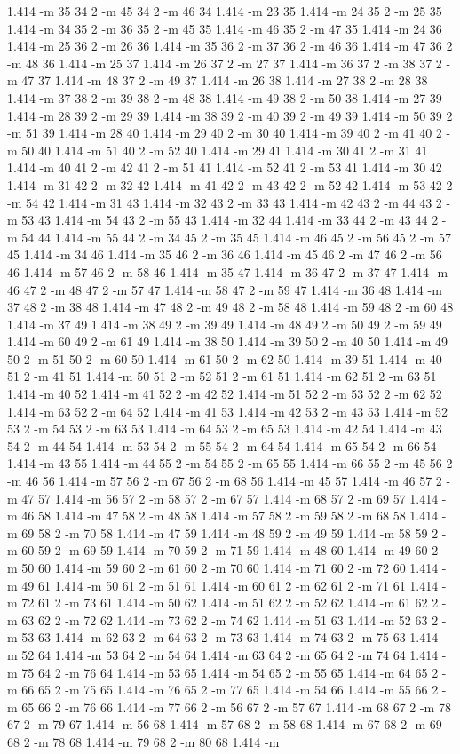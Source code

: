 \documentclass[12pt]{article}
\begin{document}
1.414 -m 35 34 2 -m 45 34 2 -m 46 34 1.414 -m 23 35 1.414 -m 24 35 2 -m 25 35 1.414 -m 34 35 2 -m 36 35 2 -m 45 35 1.414 -m 46 35 2 -m 47 35 1.414 -m 24 36 1.414 -m 25 36 2 -m 26 36 1.414 -m 35 36 2 -m 37 36 2 -m 46 36 1.414 -m 47 36 2 -m 48 36 1.414 -m 25 37 1.414 -m 26 37 2 -m 27 37 1.414 -m 36 37 2 -m 38 37 2 -m 47 37 1.414 -m 48 37 2 -m 49 37 1.414 -m 26 38 1.414 -m 27 38 2 -m 28 38 1.414 -m 37 38 2 -m 39 38 2 -m 48 38 1.414 -m 49 38 2 -m 50 38 1.414 -m 27 39 1.414 -m 28 39 2 -m 29 39 1.414 -m 38 39 2 -m 40 39 2 -m 49 39 1.414 -m 50 39 2 -m 51 39 1.414 -m 28 40 1.414 -m 29 40 2 -m 30 40 1.414 -m 39 40 2 -m 41 40 2 -m 50 40 1.414 -m 51 40 2 -m 52 40 1.414 -m 29 41 1.414 -m 30 41 2 -m 31 41 1.414 -m 40 41 2 -m 42 41 2 -m 51 41 1.414 -m 52 41 2 -m 53 41 1.414 -m 30 42 1.414 -m 31 42 2 -m 32 42 1.414 -m 41 42 2 -m 43 42 2 -m 52 42 1.414 -m 53 42 2 -m 54 42 1.414 -m 31 43 1.414 -m 32 43 2 -m 33 43 1.414 -m 42 43 2 -m 44 43 2 -m 53 43 1.414 -m 54 43 2 -m 55 43 1.414 -m 32 44 1.414 -m 33 44 2 -m 43 44 2 -m 54 44 1.414 -m 55 44 2 -m 34 45 2 -m 35 45 1.414 -m 46 45 2 -m 56 45 2 -m 57 45 1.414 -m 34 46 1.414 -m 35 46 2 -m 36 46 1.414 -m 45 46 2 -m 47 46 2 -m 56 46 1.414 -m 57 46 2 -m 58 46 1.414 -m 35 47 1.414 -m 36 47 2 -m 37 47 1.414 -m 46 47 2 -m 48 47 2 -m 57 47 1.414 -m 58 47 2 -m 59 47 1.414 -m 36 48 1.414 -m 37 48 2 -m 38 48 1.414 -m 47 48 2 -m 49 48 2 -m 58 48 1.414 -m 59 48 2 -m 60 48 1.414 -m 37 49 1.414 -m 38 49 2 -m 39 49 1.414 -m 48 49 2 -m 50 49 2 -m 59 49 1.414 -m 60 49 2 -m 61 49 1.414 -m 38 50 1.414 -m 39 50 2 -m 40 50 1.414 -m 49 50 2 -m 51 50 2 -m 60 50 1.414 -m 61 50 2 -m 62 50 1.414 -m 39 51 1.414 -m 40 51 2 -m 41 51 1.414 -m 50 51 2 -m 52 51 2 -m 61 51 1.414 -m 62 51 2 -m 63 51 1.414 -m 40 52 1.414 -m 41 52 2 -m 42 52 1.414 -m 51 52 2 -m 53 52 2 -m 62 52 1.414 -m 63 52 2 -m 64 52 1.414 -m 41 53 1.414 -m 42 53 2 -m 43 53 1.414 -m 52 53 2 -m 54 53 2 -m 63 53 1.414 -m 64 53 2 -m 65 53 1.414 -m 42 54 1.414 -m 43 54 2 -m 44 54 1.414 -m 53 54 2 -m 55 54 2 -m 64 54 1.414 -m 65 54 2 -m 66 54 1.414 -m 43 55 1.414 -m 44 55 2 -m 54 55 2 -m 65 55 1.414 -m 66 55 2 -m 45 56 2 -m 46 56 1.414 -m 57 56 2 -m 67 56 2 -m 68 56 1.414 -m 45 57 1.414 -m 46 57 2 -m 47 57 1.414 -m 56 57 2 -m 58 57 2 -m 67 57 1.414 -m 68 57 2 -m 69 57 1.414 -m 46 58 1.414 -m 47 58 2 -m 48 58 1.414 -m 57 58 2 -m 59 58 2 -m 68 58 1.414 -m 69 58 2 -m 70 58 1.414 -m 47 59 1.414 -m 48 59 2 -m 49 59 1.414 -m 58 59 2 -m 60 59 2 -m 69 59 1.414 -m 70 59 2 -m 71 59 1.414 -m 48 60 1.414 -m 49 60 2 -m 50 60 1.414 -m 59 60 2 -m 61 60 2 -m 70 60 1.414 -m 71 60 2 -m 72 60 1.414 -m 49 61 1.414 -m 50 61 2 -m 51 61 1.414 -m 60 61 2 -m 62 61 2 -m 71 61 1.414 -m 72 61 2 -m 73 61 1.414 -m 50 62 1.414 -m 51 62 2 -m 52 62 1.414 -m 61 62 2 -m 63 62 2 -m 72 62 1.414 -m 73 62 2 -m 74 62 1.414 -m 51 63 1.414 -m 52 63 2 -m 53 63 1.414 -m 62 63 2 -m 64 63 2 -m 73 63 1.414 -m 74 63 2 -m 75 63 1.414 -m 52 64 1.414 -m 53 64 2 -m 54 64 1.414 -m 63 64 2 -m 65 64 2 -m 74 64 1.414 -m 75 64 2 -m 76 64 1.414 -m 53 65 1.414 -m 54 65 2 -m 55 65 1.414 -m 64 65 2 -m 66 65 2 -m 75 65 1.414 -m 76 65 2 -m 77 65 1.414 -m 54 66 1.414 -m 55 66 2 -m 65 66 2 -m 76 66 1.414 -m 77 66 2 -m 56 67 2 -m 57 67 1.414 -m 68 67 2 -m 78 67 2 -m 79 67 1.414 -m 56 68 1.414 -m 57 68 2 -m 58 68 1.414 -m 67 68 2 -m 69 68 2 -m 78 68 1.414 -m 79 68 2 -m 80 68 1.414 -m 
\end{document}
